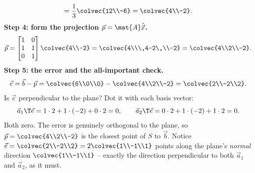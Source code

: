 \begin{example}
\[  = \frac{1}{3}\colvec{12\\-6} = \colvec{4\\-2}.
\]
\textbf{Step 4: form the projection $\vec{p}=\mat{A}\hat{\vec{x}}$.}
\[
  \vec{p} = \begin{bmatrix}1&0\\1&1\\0&1\end{bmatrix}\colvec{4\\-2}
  = \colvec{4\\\,4-2\,\\-2} = \colvec{4\\2\\-2}.
\]
\textbf{Step 5: the error and the all-important check.}
\[
  \vec{e} = \vec{b}-\vec{p} = \colvec{6\\0\\0}-\colvec{4\\2\\-2} = \colvec{2\\-2\\2}.
\]
Is $\vec{e}$ perpendicular to the plane? Dot it with each basis vector:
\[
  \vec{a}_1\T\vec{e} = 1\cdot2 + 1\cdot(-2) + 0\cdot2 = 0,
  \qquad
  \vec{a}_2\T\vec{e} = 0\cdot2 + 1\cdot(-2) + 1\cdot2 = 0.
\]
Both zero. The error is genuinely orthogonal to the plane, so $\vec{p}=\colvec{4\\2\\-2}$ is the
closest point of $S$ to $\vec{b}$. Notice $\vec{e}=\colvec{2\\-2\\2}=2\colvec{1\\-1\\1}$ points along
the plane's \emph{normal} direction $\colvec{1\\-1\\1}$ -- exactly the direction perpendicular to
both $\vec{a}_1$ and $\vec{a}_2$, as it must.
\end{example}

